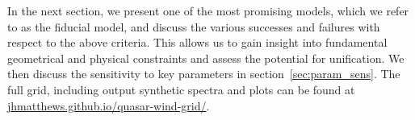 \documentclass[useAMS,usenatbib]{mn2e_x}
\begin{document}

In the next section, we present one of the most promising models,
which we refer to as the fiducial model, and discuss
the various successes and failures with respect to the above criteria.
This allows us to gain insight into fundamental geometrical 
and physical constraints and assess the potential for unification. 
We then discuss the sensitivity to key parameters in section~\ref{sec:param_sens}.
The full grid, including output synthetic spectra and plots can be found at
\url{jhmatthews.github.io/quasar-wind-grid/}.

\end{document}
